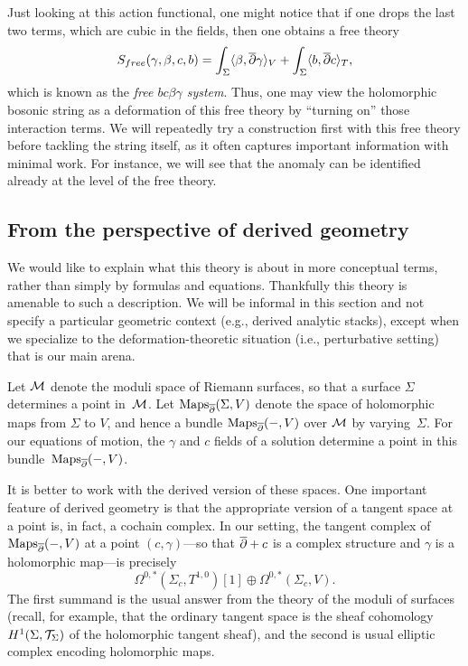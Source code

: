 
\begin{rmk}
\label{rmk:bcbg}
Just looking at this action functional, one might notice that if one drops the last two terms,
which are cubic in the fields, then one obtains a free theory
\[
S_{free}(\gamma,\beta,c,b) = 
\int_\Sigma \langle \beta, \overline{\partial} \gamma \rangle_V 
+ \int_\Sigma \langle b, \overline{\partial} c \rangle_T,
\]
which is known as the {\em free $bc\beta\gamma$ system}.
Thus, one may view the holomorphic bosonic string as a deformation of this free theory
by ``turning on'' those interaction terms.
We will repeatedly try a construction first with this free theory before tackling the string itself,
as it often captures important information with minimal work.
For instance, we will see that the anomaly can be identified already at the level of the free theory.
\end{rmk}

\subsection{From the perspective of derived geometry}

We would like to explain what this theory is about in more conceptual terms,
rather than simply by formulas and equations.
Thankfully this theory is amenable to such a description.
We will be informal in this section and not specify a particular geometric context (e.g., derived analytic stacks),
except when we specialize to the deformation-theoretic situation (i.e., perturbative setting) that is our main arena.

\def\Maps{\operatorname{Maps}}

Let $\mathcal M$ denote the moduli space of Riemann surfaces,
so that a surface $\Sigma$ determines a point in~$\mathcal M$.
Let $\Maps_{\dbar}(\Sigma,V)$ denote the space of holomorphic maps from $\Sigma$ to $V$,
and hence a bundle $\Maps_{\dbar}(-,V)$ over $\mathcal M$ by varying~$\Sigma$.
For our equations of motion, the $\gamma$ and $c$ fields of a solution determine a point in this bundle~$\Maps_{\dbar}(-,V)$.

It is better to work with the derived version of these spaces.
One important feature of derived geometry is that the appropriate version of a tangent space at a point is, in fact, a cochain complex.
In our setting, the tangent complex of $\Maps_{\dbar}(-,V)$ at a point $(c,\gamma)$---so that $\overline{\partial} +c$ is a complex structure and $\gamma$ is a holomorphic map---is precisely 
\[
\Omega^{0,*}(\Sigma_c,T^{1,0})[1] \oplus \Omega^{0,*}(\Sigma_c,V).
\]
The first summand is the usual answer from the theory of the moduli of surfaces 
(recall, for example, that the ordinary tangent space is the sheaf cohomology $H^1(\Sigma,\mathcal T_\Sigma)$ of the holomorphic tangent sheaf),
and the second is usual elliptic complex encoding holomorphic maps.

